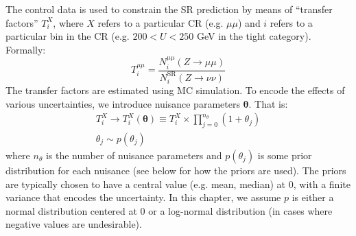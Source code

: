 The control data is used to constrain the SR prediction by means of ``transfer factors'' $T^X_i$, where $X$ refers to a particular CR (e.g. $\mu\mu$) and $i$ refers to a particular bin in the CR (e.g. $200<U<250$ GeV in the tight category).
Formally:
\begin{equation}
    T^{\mu\mu}_i = \frac{N^{\mu\mu}_i(Z\rightarrow\mu\mu)}{N^\mathrm{SR}_i(Z\rightarrow\nu\nu)}
\end{equation}
The transfer factors are estimated using MC simulation.
To encode the effects of various uncertainties, we introduce nuisance parameters $\bm{\theta}$.
That is:
\begin{gather}
    T^X_i \rightarrow T^X_i(\bm\theta) \equiv T^X_i \times \prod_{j=0}^{n_\theta} (1+\theta_j) \\ 
    \theta_j \sim p(\theta_j) 
\end{gather}
where $n_\theta$ is the number of nuisance parameters and $p(\theta_j)$ is some prior distribution for each nuisance (see below for how the priors are used).
The priors are typically chosen to have a central value (e.g. mean, median) at $0$, with a finite variance that encodes the uncertainty.
In this chapter, we assume $p$ is either a normal distribution centered at 0 or a log-normal distribution (in cases where negative values are undesirable). 

